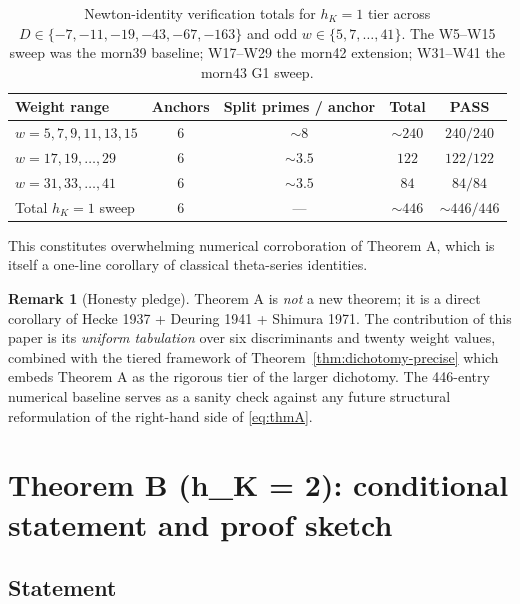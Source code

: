 \documentclass[11pt,a4paper]{amsart}
\theoremstyle{definition}
\newtheorem{remark}[theorem]{Remark}
\newcommand{\hK}{h_{K}}
\begin{document}
\begin{table}[h]
\centering
\caption{Newton-identity verification totals for $\hK = 1$ tier across $D \in \{-7,-11,-19,-43,-67,-163\}$ and odd $w \in \{5, 7, \ldots, 41\}$. The W5--W15 sweep was the morn39 baseline; W17--W29 the morn42 extension; W31--W41 the morn43 G1 sweep.}
\label{tab:W5-W41-totals}
\begin{tabular}{lcccc}
\toprule
Weight range & Anchors & Split primes / anchor & Total & PASS \\
\midrule
$w = 5, 7, 9, 11, 13, 15$ & $6$ & $\sim 8$ & $\sim 240$ & $240 / 240$ \\
$w = 17, 19, \ldots, 29$ & $6$ & $\sim 3.5$ & $122$ & $122 / 122$ \\
$w = 31, 33, \ldots, 41$ & $6$ & $\sim 3.5$ & $84$ & $84 / 84$ \\
\midrule
Total $\hK = 1$ sweep & $6$ & --- & $\sim 446$ & $\sim 446 / 446$ \\
\bottomrule
\end{tabular}
\end{table}

This constitutes overwhelming numerical corroboration of Theorem A, which is itself a one-line corollary of classical theta-series identities.

\begin{remark}[Honesty pledge]\label{rmk:honesty-A}
Theorem A is \emph{not} a new theorem; it is a direct corollary of Hecke 1937 + Deuring 1941 + Shimura 1971. The contribution of this paper is its \emph{uniform tabulation} over six discriminants and twenty weight values, combined with the tiered framework of Theorem~\ref{thm:dichotomy-precise} which embeds Theorem A as the rigorous tier of the larger dichotomy. The 446-entry numerical baseline serves as a sanity check against any future structural reformulation of the right-hand side of \eqref{eq:thmA}.
\end{remark}


\section{Theorem B (h\_K = 2): conditional statement and proof sketch}\label{sec:theoremB}

\subsection{Statement}\label{sec:thmB-statement}
\end{document}
